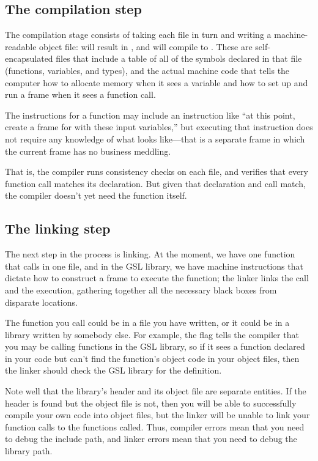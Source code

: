 \documentclass[12pt]{article}
\def\ind#1{\index{#1}#1}
\begin{document}
\subsection{The compilation step} 
The \ind{compilation}
stage consists of taking each  file in turn and
writing a machine-readable object file:  will
result in , and  will compile to
. These  are self-encapsulated
files that include a table of all of the symbols declared in that file
(functions, variables, and types), and 
the actual machine code that tells the computer how to allocate memory
when it sees a variable and how to set up and run a frame when it sees a
function call.

The instructions for a function may include an instruction like ``at this
point, create a frame for  with these input
variables,'' but executing that instruction does not require any knowledge
of what  looks like---that is a separate frame
in which the current frame has no business meddling.

That is, the compiler runs consistency checks on each file, and
verifies that every function call matches its declaration.  But given
that declaration and call match, the compiler doesn't yet need the
function itself.

\subsection{The \ind{linking} step}
The next step in the process is linking. At the moment, we have one
function that calls  in one file, and in the
GSL library, we have machine instructions that dictate how to construct
a frame to execute the  function; the linker links
the call and the execution, gathering together all the necessary black
boxes from disparate locations.

The function you call could be in a file you have written, or it could be
in a library written by somebody else.  For example, the 
flag tells the compiler that you may be calling functions in the GSL
library, so if it sees a function declared in your code but can't find
the function's object code in your object files, then the linker should check
the GSL library for the definition.

Note well that the library's header and its object file are separate
entities. If the header is found but the object file is not, then you
will be able to successfully compile your own code into object files,
but the linker will be unable to link your function calls to the
functions called. Thus, compiler errors mean that you need to debug the
include path, and linker errors mean that you need to debug the library path.
\end{document}
